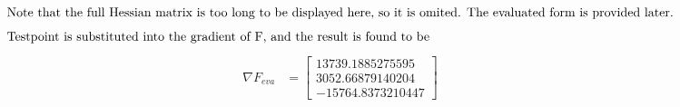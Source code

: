 \documentclass[a4paper,12pt]{article} %
\begin{document}
\begin{align*}
\intertext{Note that the full Hessian matrix is too long to be displayed here, so it is omited. The evaluated form is provided later.}
\intertext{Testpoint is substituted into the gradient of F, and the result is found to be}
\end{align*}
\begin{align*}
\nabla F_{eva} &=  \left[\begin{matrix}13739.1885275595\\3052.66879140204\\-15764.8373210447\end{matrix}\right]\\
\end{align*}
\end{document}
